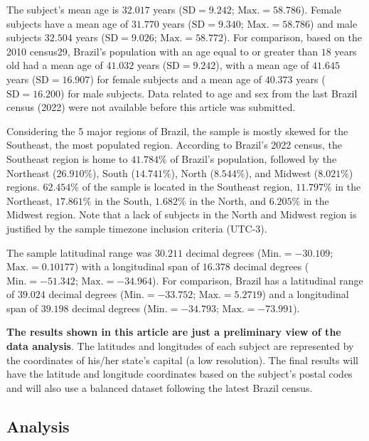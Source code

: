 \documentclass[
  12pt,
  a4paper,
  oneside]{tesesusp}
\begin{document}
The subject's mean age is \(32.017\) years (\(\text{SD} = 9.242\);
\(\text{Max.} = 58.786\)). Female subjects have a mean age of \(31.770\)
years (\(\text{SD} = 9.340\); \(\text{Max.} = 58.786\)) and male
subjects \(32.504\) years (\(\text{SD} = 9.026\);
\(\text{Max.} = 58.772\)). For comparison, based on the 2010 census29,
Brazil's population with an age equal to or greater than \(18\) years
old had a mean age of \(41.032\) years (\(\text{SD} = 9.242\)), with a
mean age of \(41.645\) years (\(\text{SD} = 16.907\)) for female
subjects and a mean age of \(40.373\) years (\(\text{SD} = 16.200\)) for
male subjects. Data related to age and sex from the last Brazil census
(2022) were not available before this article was submitted.

Considering the 5 major regions of Brazil, the sample is mostly skewed
for the Southeast, the most populated region. According to Brazil's 2022
census, the Southeast region is home to \(41.784\%\) of Brazil's
population, followed by the Northeast (\(26.910\%\)), South
(\(14.741\%\)), North (\(8.544\%\)), and Midwest (\(8.021\%\)) regions.
\(62.454\%\) of the sample is located in the Southeast region,
\(11.797\%\) in the Northeast, \(17.861\%\) in the South, \(1.682\%\) in
the North, and \(6.205\%\) in the Midwest region. Note that a lack of
subjects in the North and Midwest region is justified by the sample
timezone inclusion criteria (UTC-3).

The sample latitudinal range was \(30.211\) decimal degrees
(\(\text{Min.} = -30.109\); \(\text{Max.} = 0.10177\)) with a
longitudinal span of \(16.378\) decimal degrees
(\(\text{Min.} = -51.342\); \(\text{Max.} = -34.964\)). For comparison,
Brazil has a latitudinal range of \(39.024\) decimal degrees
(\(\text{Min.} = -33.752\); \(\text{Max.} = 5.2719\)) and a longitudinal
span of \(39.198\) decimal degrees (\(\text{Min.} = -34.793\);
\(\text{Max.} = -73.991\)).

\textbf{The results shown in this article are just a preliminary view of
the data analysis}. The latitudes and longitudes of each subject are
represented by the coordinates of his/her state's capital (a low
resolution). The final results will have the latitude and longitude
coordinates based on the subject's postal codes and will also use a
balanced dataset following the latest Brazil census.

\hypertarget{analysis}{%
\subsection{Analysis}\label{analysis}}
\end{document}
